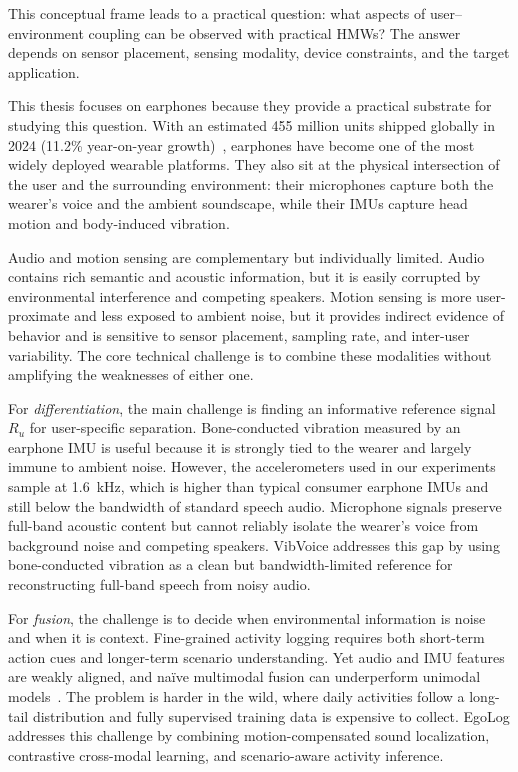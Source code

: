 This conceptual frame leads to a practical question: what aspects of user--environment coupling can be observed with practical HMWs? The answer depends on sensor placement, sensing modality, device constraints, and the target application.

This thesis focuses on earphones because they provide a practical substrate for studying this question. With an estimated 455 million units shipped globally in 2024 (11.2\% year-on-year growth)~\cite{counterpoint2024hearables}, earphones have become one of the most widely deployed wearable platforms. They also sit at the physical intersection of the user and the surrounding environment: their microphones capture both the wearer's voice and the ambient soundscape, while their IMUs capture head motion and body-induced vibration.

Audio and motion sensing are complementary but individually limited. Audio contains rich semantic and acoustic information, but it is easily corrupted by environmental interference and competing speakers. Motion sensing is more user-proximate and less exposed to ambient noise, but it provides indirect evidence of behavior and is sensitive to sensor placement, sampling rate, and inter-user variability. The core technical challenge is to combine these modalities without amplifying the weaknesses of either one.

For \textit{differentiation}, the main challenge is finding an informative reference signal $R_u$ for user-specific separation. Bone-conducted vibration measured by an earphone IMU is useful because it is strongly tied to the wearer and largely immune to ambient noise. However, the accelerometers used in our experiments sample at 1.6~kHz, which is higher than typical consumer earphone IMUs and still below the bandwidth of standard speech audio. Microphone signals preserve full-band acoustic content but cannot reliably isolate the wearer's voice from background noise and competing speakers. VibVoice addresses this gap by using bone-conducted vibration as a clean but bandwidth-limited reference for reconstructing full-band speech from noisy audio.

For \textit{fusion}, the challenge is to decide when environmental information is noise and when it is context. Fine-grained activity logging requires both short-term action cues and longer-term scenario understanding. Yet audio and IMU features are weakly aligned, and na\"ive multimodal fusion can underperform unimodal models~\cite{huang2022modality}. The problem is harder in the wild, where daily activities follow a long-tail distribution and fully supervised training data is expensive to collect. EgoLog addresses this challenge by combining motion-compensated sound localization, contrastive cross-modal learning, and scenario-aware activity inference.

